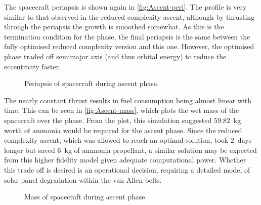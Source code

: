 The spacecraft periapsis is shown again in \autoref{fig:Ascent-peri}. The profile is very similar to that observed in the reduced complexity ascent, although by thrusting through the periapsis the growth is smoothed somewhat. As this is the termination condition for the phase, the final periapsis is the same between the fully optimised reduced complexity version and this one. However, the optimised phase traded off semimajor axis (and thus orbital energy) to reduce the eccentricity faster. 

\begin{figure}
\centering
\def\svgwidth{\figurewidth}

\caption{Periapsis of spacecraft during ascent phase.} \label{fig:Ascent-peri}
\end{figure}

The nearly constant thrust results in fuel consumption being almost linear with time. This can be seen in \autoref{fig:Ascent-mass}, which plots the wet mass of the spacecraft over the phase. From the plot, this simulation suggested 59.82~kg worth of ammonia would be required for the ascent phase. %
Since the reduced complexity ascent, which was allowed to reach an optimal solution, took 2~days longer but saved 6~kg of ammonia propellant, a similar solution may be expected from this higher fidelity model given adequate computational power. Whether this trade off is desired is an operational decision, requiring a detailed model of solar panel degradation within the van Allen belts.

\begin{figure}
\centering
\def\svgwidth{\figurewidth}

\caption{Mass of spacecraft during ascent phase.} \label{fig:Ascent-mass}
\end{figure}

